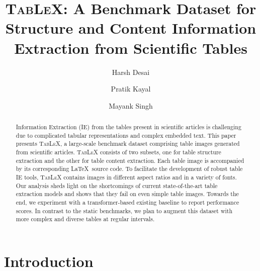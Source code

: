 \documentclass[runningheads]{llncs}
\begin{document}
\title{\textsc{TabLeX}: A Benchmark Dataset for Structure and Content Information Extraction from Scientific Tables}
%

\author{ 
Harsh Desai \and
Pratik Kayal \and
Mayank Singh
}
%
%

\maketitle  
\begin{abstract}
Information Extraction (IE) from the tables present in scientific articles is challenging due to complicated tabular representations and complex embedded text. This paper presents \textsc{TabLeX}, a large-scale benchmark dataset comprising table images generated from scientific articles. \textsc{TabLeX} consists of two subsets, one for table structure extraction and the other for table content extraction. Each table image is accompanied by its corresponding \LaTeX~source code. To facilitate the development of robust table IE tools, \textsc{TabLeX} contains images in different aspect ratios and in a variety of fonts. Our analysis sheds light on the shortcomings of current state-of-the-art table extraction models and shows that they fail on even simple table images. Towards the end, we experiment with a transformer-based existing baseline to report performance scores. In contrast to the static benchmarks, we plan to augment this dataset with more complex and diverse tables at regular intervals. 

\end{abstract}
%
%
%
\section{Introduction}
\label{section1}
\end{document}
